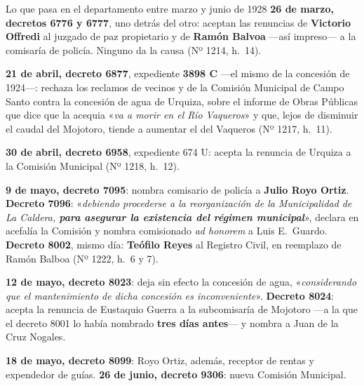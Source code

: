 \begin{ficha}{Lo que pasa en el departamento entre marzo y junio de 1928}
\textbf{26 de marzo, decretos 6776 y 6777}, uno detrás del otro: aceptan las renuncias de
\textbf{Victorio Offredi} al juzgado de paz propietario y de \textbf{Ramón Balvoa} ---así
impreso--- a la comisaría de policía. Ninguno da la causa (Nº 1214, h.\ 14).

\textbf{21 de abril, decreto 6877}, expediente \textbf{3898 C} ---el mismo de la concesión de
1924---: rechaza los reclamos de vecinos y de la Comisión Municipal de Campo Santo contra la
concesión de agua de Urquiza, sobre el informe de Obras Públicas que
dice que la acequia «\textit{va a morir en el Río Vaqueros}» y que, lejos de disminuir el caudal
del Mojotoro, tiende a aumentar el del Vaqueros (Nº 1217, h.\ 11).

\textbf{30 de abril, decreto 6958}, expediente 674 U: acepta la renuncia de Urquiza a la Comisión
Municipal (Nº 1218, h.\ 12).

\textbf{9 de mayo, decreto 7095}: nombra comisario de policía a \textbf{Julio Royo Ortiz}.
\textbf{Decreto 7096}: «\textit{debiendo procederse a la reorganización de la Municipalidad de La
Caldera, \textbf{para asegurar la existencia del régimen municipal}}», declara en acefalía la
Comisión y nombra comisionado \textit{ad honorem} a Luis E.\ Guardo. \textbf{Decreto 8002}, mismo
día: \textbf{Teófilo Reyes} al Registro Civil, en reemplazo de Ramón Balboa (Nº 1222, h.\ 6 y 7).

\textbf{12 de mayo, decreto 8023}: deja sin efecto la concesión de agua, «\textit{considerando que
el mantenimiento de dicha concesión es inconveniente}». \textbf{Decreto 8024}: acepta la renuncia
de Eustaquio Guerra a la subcomisaría de Mojotoro ---a la que el decreto 8001 lo había nombrado
\textbf{tres días antes}--- y nombra a Juan de la Cruz Nogales.

\textbf{18 de mayo, decreto 8099}: Royo Ortiz, además, receptor de rentas y expendedor de guías.
\textbf{26 de junio, decreto 9306}: nueva Comisión Municipal.
\end{ficha}

